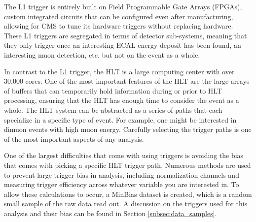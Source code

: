 The L1 trigger is entirely built on Field Programmable Gate Arrays (FPGAs), custom integrated circuits that can be configured even after manufacturing, allowing for CMS to tune its hardware triggers without replacing hardware. These L1 triggers are segregated in terms of detector sub-systems, meaning that they only trigger once an interesting ECAL energy deposit has been found, an interesting muon detection, etc. but not on the event as a whole. 

In contrast to the L1 trigger, the HLT is a large computing center with over 30,000 cores. One of the most important features of the HLT are the large arrays of buffers that can temporarily hold information during or prior to HLT processing, ensuring that the HLT has enough time to consider the event as a whole. The HLT system can be abstracted as a series of paths that each specialize in a specific type of event. For example, one might be interested in dimuon events with high muon energy. Carefully selecting the trigger paths is one of the most important aspects of any analysis. 

One of the largest difficulties that come with using triggers is avoiding the bias that comes with picking a specific HLT trigger path. Numerous methods are used to prevent large trigger bias in analysis, including normalization channels and measuring trigger efficiency across whatever variable you are interested in. To allow these calculations to occur, a MinBias dataset is created, which is a random small sample of the raw data read out. A discussion on the triggers used for this analysis and their bias can be found in Section \ref{subsec:data_samples}.







